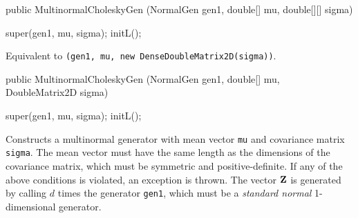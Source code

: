 \begin{code}

   public MultinormalCholeskyGen (NormalGen gen1, double[] mu,
                                  double[][] sigma)\begin{hide} {
      super(gen1, mu, sigma);
      initL();
   }\end{hide}
\end{code}
\begin{tabb}   Equivalent to
 \texttt{(gen1, mu, new DenseDoubleMatrix2D(sigma))}.
\end{tabb}
\begin{htmlonly}
\end{htmlonly}
\begin{code}

   public MultinormalCholeskyGen (NormalGen gen1, double[] mu,
                                  DoubleMatrix2D sigma)\begin{hide} {
      super(gen1, mu, sigma);
      initL();
   }\end{hide}
\end{code}
\begin{tabb} Constructs a multinormal generator with mean vector \texttt{mu}
 and covariance matrix \texttt{sigma}. The mean vector must have the same
 length as the dimensions of the covariance matrix, which must be symmetric
 and positive-definite.
 If any of the above conditions is violated, an exception is thrown.
 The vector $\textbf{Z}$ is generated by calling $d$ times the generator \texttt{gen1},
 which must be a \emph{standard normal} 1-dimensional generator.
\end{tabb}
\begin{htmlonly}
\end{htmlonly}


